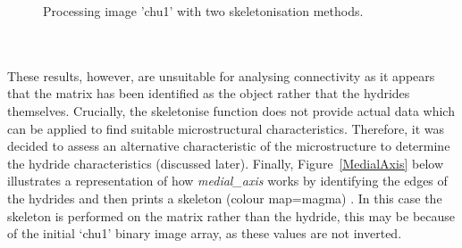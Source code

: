 \documentclass{article}
\begin{document}
	\begin{figure}[h]
		\centering
		\hfill
		\caption{Processing image 'chu1' with two skeletonisation methods. }
		\label{Skeletonise}
	\end{figure}
    \\
    \\
	\noindent These results, however, are unsuitable for analysing connectivity as it appears that the matrix has been identified as the object rather that the hydrides themselves. Crucially, the skeletonise function does not provide actual data which can be applied to find suitable microstructural characteristics. Therefore, it was decided to assess an alternative characteristic of the microstructure to determine the hydride characteristics (discussed later). Finally, Figure~\ref{MedialAxis} below illustrates a representation of how \textit{medial\_axis} works by identifying the edges of the hydrides and then prints a skeleton (colour map=magma) \cite{ScikitimageA}. In this case the skeleton is performed on the matrix rather than the hydride, this may be because of the initial ‘chu1’ binary image array, as these values are not inverted.
	\\
\end{document}
